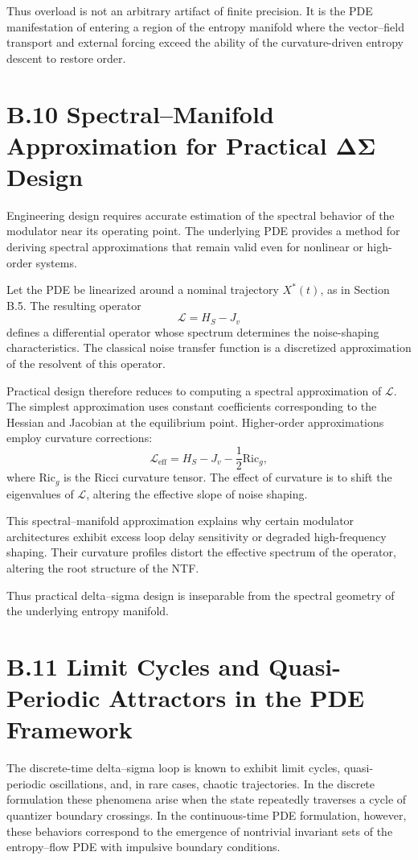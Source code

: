 Thus overload is not an arbitrary artifact of finite precision. It is the PDE manifestation of entering a region of the entropy manifold where the vector–field transport and external forcing exceed the ability of the curvature-driven entropy descent to restore order.

\section{B.10 Spectral–Manifold Approximation for Practical ΔΣ Design}

Engineering design requires accurate estimation of the spectral behavior of the modulator near its operating point. The underlying PDE provides a method for deriving spectral approximations that remain valid even for nonlinear or high-order systems.

Let the PDE be linearized around a nominal trajectory \(X^\ast(t)\), as in Section B.5. The resulting operator
\[
\mathcal{L} = H_{S} - J_{v}
\]
defines a differential operator whose spectrum determines the noise-shaping characteristics. The classical noise transfer function is a discretized approximation of the resolvent of this operator.

Practical design therefore reduces to computing a spectral approximation of \(\mathcal{L}\). The simplest approximation uses constant coefficients corresponding to the Hessian and Jacobian at the equilibrium point. Higher-order approximations employ curvature corrections:
\[
\mathcal{L}_{\text{eff}} = H_{S} 
- J_{v} 
- \frac{1}{2}\mathrm{Ric}_{g},
\]
where \(\mathrm{Ric}_{g}\) is the Ricci curvature tensor. The effect of curvature is to shift the eigenvalues of \(\mathcal{L}\), altering the effective slope of noise shaping.

This spectral–manifold approximation explains why certain modulator architectures exhibit excess loop delay sensitivity or degraded high-frequency shaping. Their curvature profiles distort the effective spectrum of the operator, altering the root structure of the NTF.

Thus practical delta–sigma design is inseparable from the spectral geometry of the underlying entropy manifold.

\section{B.11 Limit Cycles and Quasi-Periodic Attractors in the PDE Framework}

The discrete-time delta–sigma loop is known to exhibit limit cycles, quasi-periodic oscillations, and, in rare cases, chaotic trajectories. In the discrete formulation these phenomena arise when the state repeatedly traverses a cycle of quantizer boundary crossings. In the continuous-time PDE formulation, however, these behaviors correspond to the emergence of nontrivial invariant sets of the entropy–flow PDE with impulsive boundary conditions.


